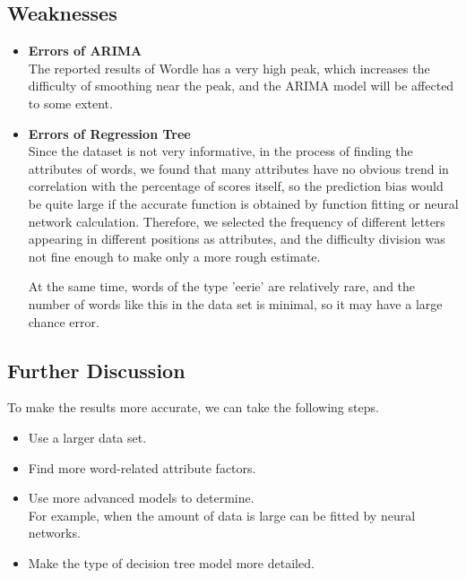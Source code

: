 \documentclass[12pt]{article}
\begin{document}
\subsection{Weaknesses}

\begin{itemize}
    \item \textbf{Errors of ARIMA}\\
    The reported results of Wordle has a very high peak, which increases the difficulty of smoothing near the peak, and the ARIMA model will be affected to some extent.
    \item \textbf{Errors of Regression Tree }\\
    Since the dataset is not very informative, in the process of finding the attributes of words, we found that many attributes have no obvious trend in correlation with the percentage of scores itself, so the prediction bias would be quite large if the accurate function is obtained by function fitting or neural network calculation. Therefore, we selected the frequency of different letters appearing in different positions as attributes, and the difficulty division was not fine enough to make only a more rough estimate.

    At the same time, words of the type 'eerie' are relatively rare, and the number of words like this in the data set is minimal, so it may have a large chance error.
\end{itemize}





\subsection{Further Discussion}
To make the results more accurate, we can take the following steps.
\begin{itemize}
    \item Use a larger data set.
    \item Find more word-related attribute factors.
    \item Use more advanced models to determine. \\
    For example, when the amount of data is large can be fitted by neural networks.
    \item Make the type of decision tree model more detailed.

\end{itemize}

\newpage
\end{document}

